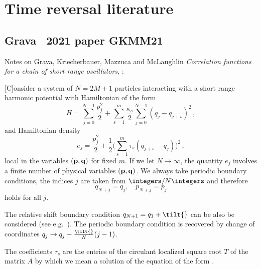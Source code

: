 
\section{Time reversal literature}
\label{sect:reverLit}
\renewcommand{\ssp}{\ensuremath{\phi}}             %
\renewcommand{\Ssym}[1]{{\ensuremath{m_{#1}}}}    %
\renewcommand{\Xx}{\ensuremath{\mathsf{\Phi}}}      %

\subsection{Grava \etal\ 2021 paper {GKMM21}}
\label{sect:GKMM21}
Notes on
Grava, Kriecherbauer,  Mazzuca and McLaughlin
{\em Correlation functions for a chain of short range oscillators},
:
\bigskip

[C]onsider a system of $N=2M+1$ particles interacting with a short range
harmonic potential with 	 Hamiltonian of the form
	\begin{equation}
	\label{GKMM21:H0}
H=\sum_{j=0}^{N-1}\frac{p_j^2}{2}+\sum_{s=1}^m\frac{\kappa_s}{2}\sum_{j=0}^{N-1}(q_j-q_{j+s})^2\,,
\end{equation}
and
Hamiltonian density
\[
e_j=\frac{p_j^2}{2}+\frac{1}{2} \Big(\sum_{s=1}^m \tau_s (q_{j+s}-q_j)
\Big)^2
\,,
\]
local in the variables $({\bf{p}},{\bf{q}})$ for fixed $m$.  If we let
$N\to\infty$, the quantity $e_j$ involves a finite number of physical
variables  $({\bf{p}},{\bf{q}})$.
We always take periodic boundary conditions,
the indices $j$ are taken from $\integers / N\integers$ and therefore
\[
q_{N+j}=q_j,\quad p_{N+j}=p_j
\]
holds for all $j$.

The relative shift \tilt{}  boundary condition $q_{N+1}=q_1+\tilt{}$ can
be also be considered  (see e.g.~). The periodic boundary
condition is recovered by  change  of coordinates $q_j\to
q_j-\frac{\tilt{}}{N}(j-1)$.

The coefficients $\tau_s$ are the entries of the circulant localized
square root $T$ of the matrix  $A$ by which we mean a solution of the
equation  of the form .

